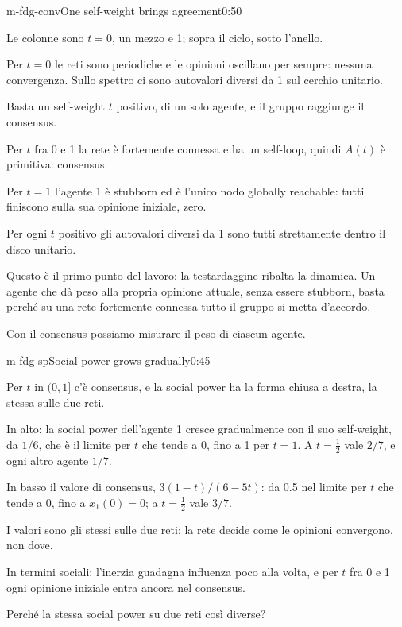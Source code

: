 \begin{slide}{m-fdg-conv}{One self-weight brings agreement}{0:50}
  \begin{discorso}
    \item Le colonne sono $t=0$, un mezzo e 1; sopra il ciclo, sotto l'anello.
    \item Per $t=0$ le reti sono periodiche e le opinioni oscillano per sempre: nessuna convergenza. Sullo spettro ci sono autovalori diversi da 1 sul cerchio unitario.
    \item Basta un self-weight $t$ positivo, di un solo agente, e il gruppo raggiunge il consensus.
    \item Per $t$ fra 0 e 1 la rete è fortemente connessa e ha un self-loop, quindi $A(t)$ è primitiva: consensus.
    \item Per $t=1$ l'agente 1 è stubborn ed è l'unico nodo globally reachable: tutti finiscono sulla sua opinione iniziale, zero.
    \item Per ogni $t$ positivo gli autovalori diversi da 1 sono tutti strettamente dentro il disco unitario.
    \item Questo è il primo punto del lavoro: la testardaggine ribalta la dinamica. Un agente che dà peso alla propria opinione attuale, senza essere stubborn, basta perché su una rete fortemente connessa tutto il gruppo si metta d'accordo.
    \item Con il consensus possiamo misurare il peso di ciascun agente.
  \end{discorso}
\end{slide}

\begin{slide}{m-fdg-sp}{Social power grows gradually}{0:45}
  \begin{discorso}
    \item Per $t$ in $(0,1]$ c'è consensus, e la social power ha la forma chiusa a destra, la stessa sulle due reti.
    \item In alto: la social power dell'agente 1 cresce gradualmente con il suo self-weight, da $1/6$, che è il limite per $t$ che tende a 0, fino a 1 per $t=1$. A $t=\tfrac12$ vale $2/7$, e ogni altro agente $1/7$.
    \item In basso il valore di consensus, $3(1-t)/(6-5t)$: da 0.5 nel limite per $t$ che tende a 0, fino a $x_1(0)=0$; a $t=\tfrac12$ vale $3/7$.
    \item I valori sono gli stessi sulle due reti: la rete decide come le opinioni convergono, non dove.
    \item In termini sociali: l'inerzia guadagna influenza poco alla volta, e per $t$ fra 0 e 1 ogni opinione iniziale entra ancora nel consensus.
    \item Perché la stessa social power su due reti così diverse?
  \end{discorso}
\end{slide}

